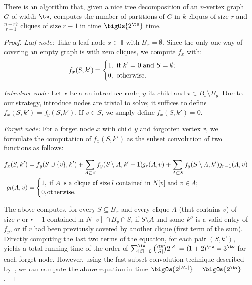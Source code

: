 \begin{theorem}
    \label{thm:clique_part}
    There is an algorithm that, given a nice tree decomposition of an $n$-vertex graph $G$ of width $\tw$, computes the number of partitions of $G$ in $k$ cliques of size $r$ and $\frac{n - rk}{r-1}$ cliques of size $r-1$ in time $\bigOs{2^{\tw}}$ time.
\end{theorem}

\begin{proof}
    \textit{Leaf node:} Take a leaf node $x \in \mathbb{T}$ with $B_x = \emptyset$. 
    Since the only one way of covering an empty graph is with zero cliques, we compute $f_x$ with:
    \begin{equation*}
        \centering
        \hfill f_x(S, k') =
        \begin{cases}
            1, \text{ if } k' = 0 \text{ and } S = \emptyset \text{;}\\
            0, \text{ otherwise.}\\
        \end{cases}
    \end{equation*}
    
    \emph{Introduce node:} Let $x$ be a an introduce node, $y$ its child and $v \in B_x \setminus B_y$.
    Due to our strategy, introduce nodes are trivial to solve; it suffices to define $f_x(S, k') = f_y(S, k')$. If $v \in S$, we simply define $f_x(S, k') = 0$.
    
    \emph{Forget node:} For a forget node $x$ with child $y$ and forgotten vertex $v$, we formulate the computation of $f_x(S, k')$ as the subset convolution of two functions as follows:
    
    \begin{align*}
        \centering
        f_x(S, k') &= f_y(S \cup \{v\}, k') + \sum_{A \subseteq S} f_y(S \setminus A, k' - 1)g_r(A, v) + \sum_{A \subseteq S} f_y(S \setminus A, k')g_{r-1}(A, v)\\
        g_l(A, v) &=
            \begin{cases}
                1, \text{ if $A$ is a clique of size $l$ contained in $N[v]$ and $v \in A$;}\\
                0, \text{otherwise.}
            \end{cases}
    \end{align*}
    
    The above computes, for every $S \subseteq B_x$ and every clique $A$ (that contains $v$) of size $r$ or $r - 1$ contained in $N[v] \cap B_y \cap S$, if $S \setminus A$ and some $k''$ is a valid entry of $f_y$, or if $v$ had been previously covered by another clique (first term of the sum).
    Directly computing the last two terms of the equation, for each pair $(S, k')$, yields a total running time of the order of $ \sum_{|S| = 0}^\tw \binom{\tw}{|S|}2^{|S|} = (1+2)^\tw = 3^\tw$ for each forget node.
    However, using the fast subset convolution technique described by~\cite{fourier_mobius}, we can compute the above equation in time $\bigOs{2^{|B_x|}} = \bigOs{2^{\tw}}$.
    

\end{proof}
